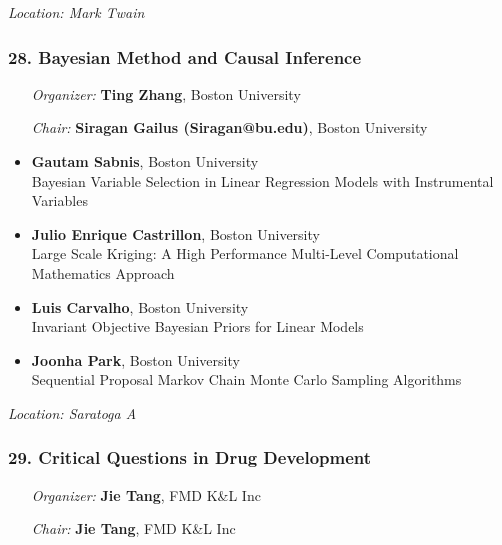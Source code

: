 \emph{Location: Mark Twain}

\subsubsection*{28. Bayesian Method and Causal Inference}

\begin{enumerate}[align=left]
\item [\emph{Organizer:}] \textbf{Ting Zhang}, Boston University
\item [\emph{Chair:}] \textbf{Siragan Gailus (Siragan@bu.edu)},  Boston University
\end{enumerate}

\begin{itemize}
\item \textbf{Gautam Sabnis}, Boston University \\
Bayesian Variable Selection in Linear Regression Models with Instrumental Variables
\item \textbf{Julio Enrique Castrillon}, Boston University \\
Large Scale Kriging: A High Performance Multi-Level Computational Mathematics Approach
\item \textbf{Luis Carvalho}, Boston University \\
Invariant Objective Bayesian Priors for Linear Models
\item \textbf{Joonha Park}, Boston University \\
Sequential Proposal Markov Chain Monte Carlo Sampling Algorithms
\end{itemize}

\emph{Location: Saratoga A}

\subsubsection*{29. Critical Questions in Drug Development}

\begin{enumerate}[align=left]
\item [\emph{Organizer:}] \textbf{Jie Tang}, FMD K\&L Inc
\item [\emph{Chair:}] \textbf{Jie Tang}, FMD K\&L Inc
\end{enumerate}

